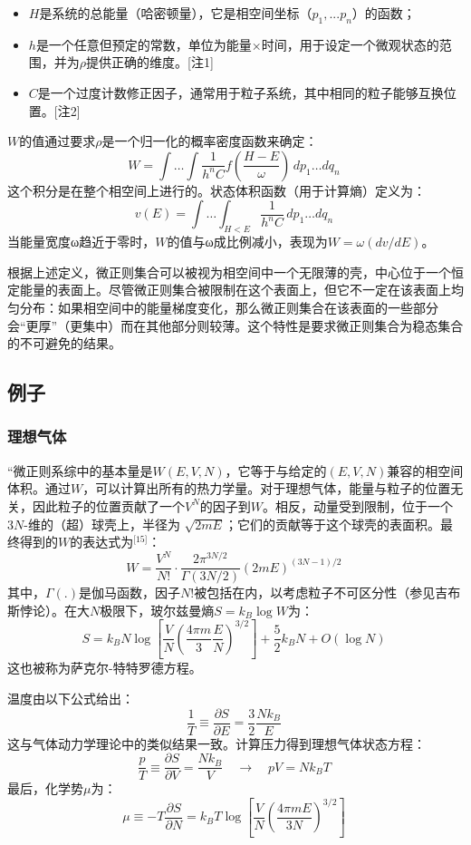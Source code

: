 \begin{itemize}
\item \(H\)是系统的总能量（哈密顿量），它是相空间坐标（\(p_1, ... p_n\)）的函数；  
\item \(h\)是一个任意但预定的常数，单位为能量×时间，用于设定一个微观状态的范围，并为\(\rho\)提供正确的维度。[注1]  
\item \(C\)是一个过度计数修正因子，通常用于粒子系统，其中相同的粒子能够互换位置。[注2]  
\end{itemize}
\(W\)的值通过要求\(\rho\)是一个归一化的概率密度函数来确定：
\[
W = \int \ldots \int \frac{1}{h^n C} f\left(\frac{H - E}{\omega}\right) \, dp_1 \ldots dq_n~
\]
这个积分是在整个相空间上进行的。状态体积函数（用于计算熵）定义为：
\[
v(E) = \int \ldots \int_{H < E} \frac{1}{h^n C} \, dp_1 \ldots dq_n~
\]
当能量宽度ω趋近于零时，\(W\)的值与ω成比例减小，表现为\( W = \omega \left(dv/dE\right)\)。

根据上述定义，微正则集合可以被视为相空间中一个无限薄的壳，中心位于一个恒定能量的表面上。尽管微正则集合被限制在这个表面上，但它不一定在该表面上均匀分布：如果相空间中的能量梯度变化，那么微正则集合在该表面的一些部分会“更厚”（更集中）而在其他部分则较薄。这个特性是要求微正则集合为稳态集合的不可避免的结果。
\subsection{例子}
\subsubsection{理想气体}
“微正则系综中的基本量是\( W(E, V, N) \)，它等于与给定的\( (E, V, N) \)兼容的相空间体积。通过\( W \)，可以计算出所有的热力学量。对于理想气体，能量与粒子的位置无关，因此粒子的位置贡献了一个\( V^N \)的因子到\( W \)。相反，动量受到限制，位于一个\( 3N \)-维的（超）球壳上，半径为 \( \sqrt{2mE} \)；它们的贡献等于这个球壳的表面积。最终得到的\( W \)的表达式为\(^\text{[15]}\)：
\[
W = \frac{V^N}{N!} \cdot \frac{2\pi^{3N/2}}{\Gamma(3N/2)} \left( 2mE \right)^{(3N-1)/2}~
\]
其中，\( \Gamma(.) \)是伽马函数，因子\( N! \)被包括在内，以考虑粒子不可区分性（参见吉布斯悖论）。在大\( N \)极限下，玻尔兹曼熵\( S = k_B \log W \)为：
\[
S = k_B N \log \left[ \frac{V}{N} \left( \frac{4 \pi m}{3} \frac{E}{N} \right)^{3/2} \right] + \frac{5}{2} k_B N + O(\log N)~
\]
这也被称为萨克尔-特特罗德方程。

温度由以下公式给出：
\[
\frac{1}{T} \equiv \frac{\partial S}{\partial E} = \frac{3}{2} \frac{N k_B}{E}~
\]
这与气体动力学理论中的类似结果一致。计算压力得到理想气体状态方程：
\[
\frac{p}{T} \equiv \frac{\partial S}{\partial V} = \frac{N k_B}{V} \quad \rightarrow \quad pV = N k_B T~
\]
最后，化学势\(\mu\)为：
\[
\mu \equiv -T \frac{\partial S}{\partial N} = k_B T \log \left[ \frac{V}{N} \left( \frac{4\pi m E}{3N} \right)^{3/2} \right]~
\]
